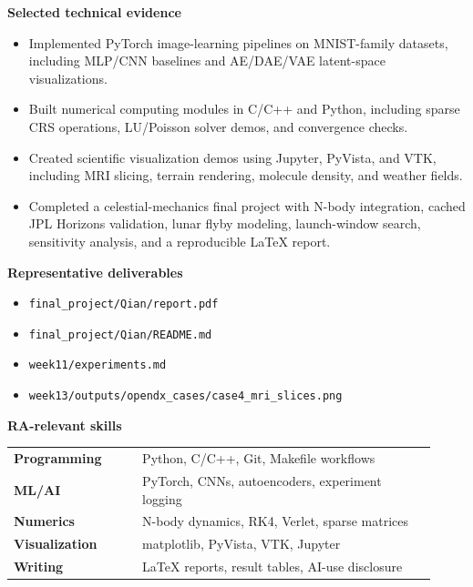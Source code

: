 \documentclass[10pt,a4paper]{article}
\begin{document}
\vspace{8pt}
\begin{minipage}[t]{0.52\linewidth}
\raggedright
\textbf{\color{accent}Selected technical evidence}
\begin{itemize}\setlength\itemsep{2pt}
  \item Implemented PyTorch image-learning pipelines on MNIST-family datasets,
  including MLP/CNN baselines and AE/DAE/VAE latent-space visualizations.
  \item Built numerical computing modules in C/C++ and Python, including sparse
  CRS operations, LU/Poisson solver demos, and convergence checks.
  \item Created scientific visualization demos using Jupyter, PyVista, and VTK,
  including MRI slicing, terrain rendering, molecule density, and weather fields.
  \item Completed a celestial-mechanics final project with N-body integration,
  cached JPL Horizons validation, lunar flyby modeling, launch-window search,
  sensitivity analysis, and a reproducible LaTeX report.
\end{itemize}

\vspace{3pt}
\textbf{\color{accent}Representative deliverables}
\begin{itemize}\setlength\itemsep{2pt}
  \item \texttt{final\_project/Qian/report.pdf}
  \item \texttt{final\_project/Qian/README.md}
  \item \texttt{week11/experiments.md}
  \item \texttt{week13/outputs/opendx\_cases/case4\_mri\_slices.png}
\end{itemize}
\end{minipage}
\hfill
\begin{minipage}[t]{0.45\linewidth}
\raggedright
\textbf{\color{accent}RA-relevant skills}
\begin{tabular}{@{}>{\bfseries}p{0.28\linewidth}p{0.64\linewidth}@{}}
Programming & Python, C/C++, Git, Makefile workflows \\
ML/AI & PyTorch, CNNs, autoencoders, experiment logging \\
Numerics & N-body dynamics, RK4, Verlet, sparse matrices \\
Visualization & matplotlib, PyVista, VTK, Jupyter \\
Writing & LaTeX reports, result tables, AI-use disclosure \\
\end{tabular}
\end{minipage}
\end{document}
